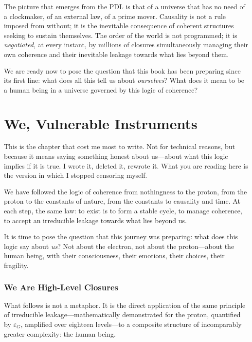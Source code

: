 \documentclass[12pt, a4paper, openright]{book}
\begin{document}
\medskip

The picture that emerges from the PDL is that of a universe that has no need of a clockmaker, of an external law, of a prime mover. Causality is not a rule imposed from without; it is the inevitable consequence of coherent structures seeking to sustain themselves. The order of the world is not programmed; it is \emph{negotiated}, at every instant, by millions of closures simultaneously managing their own coherence and their inevitable leakage towards what lies beyond them.

\medskip

We are ready now to pose the question that this book has been preparing since its first line: what does all this tell us about \emph{ourselves}? What does it mean to be a human being in a universe governed by this logic of coherence? 

\chapter{We, Vulnerable Instruments}

This is the chapter that cost me most to write. Not for technical reasons, but because it means saying something honest about us---about what this logic implies if it is true. I wrote it, deleted it, rewrote it. What you are reading here is the version in which I stopped censoring myself.

\medskip

We have followed the logic of coherence from nothingness to the proton, from the proton to the constants of nature, from the constants to causality and time. At each step, the same law: to exist is to form a stable cycle, to manage coherence, to accept an irreducible leakage towards what lies beyond us.

\medskip

It is time to pose the question that this journey was preparing: what does this logic say about \emph{us}? Not about the electron, not about the proton---about the human being, with their consciousness, their emotions, their choices, their fragility.

\subsection*{We Are High-Level Closures}

What follows is not a metaphor. It is the direct application of the same principle of irreducible leakage---mathematically demonstrated for the proton, quantified by $\varepsilon_G$, amplified over eighteen levels---to a composite structure of incomparably greater complexity: the human being.
\end{document}
